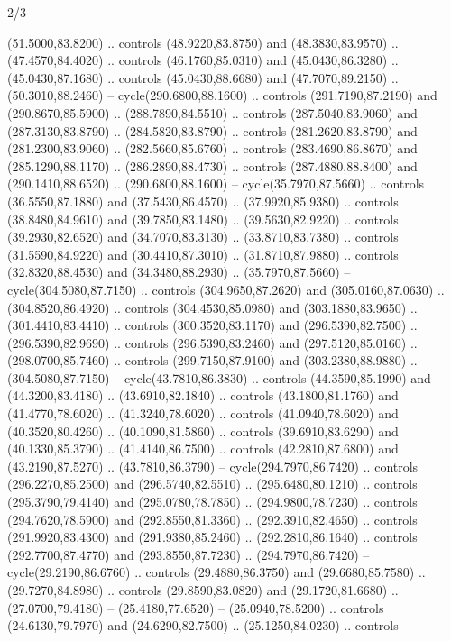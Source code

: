 \begin{flagdescription}{2/3}
\begin{scope}[xshift=0.5\flaglength,yshift=0.5\flagwidth,scale=\stretchfactor]
\begin{scope}[scale=0.001645\flagwidth,yshift=65mm,xshift=-63mm]
\begin{scope}[y=0.80pt, x=0.80pt, yscale=-1,]
\begin{scope}[cm={{1.33333,0.0,0.0,1.33333,(0.0,1e-05)}}]
  (51.5000,83.8200) .. controls (48.9220,83.8750) and (48.3830,83.9570) ..
  (47.4570,84.4020) .. controls (46.1760,85.0310) and (45.0430,86.3280) ..
  (45.0430,87.1680) .. controls (45.0430,88.6680) and (47.7070,89.2150) ..
  (50.3010,88.2460) -- cycle(290.6800,88.1600) .. controls (291.7190,87.2190)
  and (290.8670,85.5900) .. (288.7890,84.5510) .. controls (287.5040,83.9060)
  and (287.3130,83.8790) .. (284.5820,83.8790) .. controls (281.2620,83.8790)
  and (281.2300,83.9060) .. (282.5660,85.6760) .. controls (283.4690,86.8670)
  and (285.1290,88.1170) .. (286.2890,88.4730) .. controls (287.4880,88.8400)
  and (290.1410,88.6520) .. (290.6800,88.1600) -- cycle(35.7970,87.5660) ..
  controls (36.5550,87.1880) and (37.5430,86.4570) .. (37.9920,85.9380) ..
  controls (38.8480,84.9610) and (39.7850,83.1480) .. (39.5630,82.9220) ..
  controls (39.2930,82.6520) and (34.7070,83.3130) .. (33.8710,83.7380) ..
  controls (31.5590,84.9220) and (30.4410,87.3010) .. (31.8710,87.9880) ..
  controls (32.8320,88.4530) and (34.3480,88.2930) .. (35.7970,87.5660) --
  cycle(304.5080,87.7150) .. controls (304.9650,87.2620) and (305.0160,87.0630)
  .. (304.8520,86.4920) .. controls (304.4530,85.0980) and (303.1880,83.9650) ..
  (301.4410,83.4410) .. controls (300.3520,83.1170) and (296.5390,82.7500) ..
  (296.5390,82.9690) .. controls (296.5390,83.2460) and (297.5120,85.0160) ..
  (298.0700,85.7460) .. controls (299.7150,87.9100) and (303.2380,88.9880) ..
  (304.5080,87.7150) -- cycle(43.7810,86.3830) .. controls (44.3590,85.1990) and
  (44.3200,83.4180) .. (43.6910,82.1840) .. controls (43.1800,81.1760) and
  (41.4770,78.6020) .. (41.3240,78.6020) .. controls (41.0940,78.6020) and
  (40.3520,80.4260) .. (40.1090,81.5860) .. controls (39.6910,83.6290) and
  (40.1330,85.3790) .. (41.4140,86.7500) .. controls (42.2810,87.6800) and
  (43.2190,87.5270) .. (43.7810,86.3790) -- cycle(294.7970,86.7420) .. controls
  (296.2270,85.2500) and (296.5740,82.5510) .. (295.6480,80.1210) .. controls
  (295.3790,79.4140) and (295.0780,78.7850) .. (294.9800,78.7230) .. controls
  (294.7620,78.5900) and (292.8550,81.3360) .. (292.3910,82.4650) .. controls
  (291.9920,83.4300) and (291.9380,85.2460) .. (292.2810,86.1640) .. controls
  (292.7700,87.4770) and (293.8550,87.7230) .. (294.7970,86.7420) --
  cycle(29.2190,86.6760) .. controls (29.4880,86.3750) and (29.6680,85.7580) ..
  (29.7270,84.8980) .. controls (29.8590,83.0820) and (29.1720,81.6680) ..
  (27.0700,79.4180) -- (25.4180,77.6520) -- (25.0940,78.5200) .. controls
  (24.6130,79.7970) and (24.6290,82.7500) .. (25.1250,84.0230) .. controls

\end{scope}
\end{scope}
\end{scope}
\end{scope}
\end{flagdescription}

